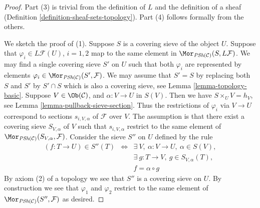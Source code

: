 \begin{proof}
Part (3) is trivial from the definition of $L$ and
the definition of a sheaf (Definition \ref{definition-sheaf-sets-topology}).
Part (4) follows formally from the others.

\medskip\noindent
We sketch the proof of (1). Suppose $S$ is a covering sieve
of the object $U$. Suppose that $\varphi_i \in L\mathcal{F}(U)$,
$i = 1, 2$ map to the same element in
$\Mor_{\textit{PSh}(\mathcal{C})}(S, L\mathcal{F})$.
We may find a single covering sieve $S'$ on $U$ such
that both $\varphi_i$ are represented by elements
$\varphi_i \in \Mor_{\textit{PSh}(\mathcal{C})}(S', \mathcal{F})$.
We may assume that $S' = S$ by replacing both $S$ and $S'$ by
$S' \cap S$ which is also a covering sieve, see Lemma \ref{lemma-topology-basic}.
Suppose $V\in \Ob(\mathcal{C})$, and
$\alpha : V \to U$ in $S(V)$.
Then we have $S \times_U V = h_V$,
see Lemma \ref{lemma-pullback-sieve-section}. Thus the restrictions
of $\varphi_i$ via $V \to U$ correspond to sections $s_{i, V, \alpha}$
of $\mathcal{F}$ over $V$. The assumption is that there exist
a covering sieve $S_{V, \alpha}$ of $V$ such that
$s_{i, V, \alpha}$ restrict to the same element of
$\Mor_{\textit{PSh}(\mathcal{C})}(S_{V, \alpha}, \mathcal{F})$.
Consider the sieve $S''$ on $U$ defined by the rule
\begin{eqnarray}
\label{equation-S-prime-prime}
(f : T \to U) \in S''(T)
& \Leftrightarrow &
\exists\ V , \ \alpha : V \to U, \ \alpha \in S(V), \nonumber \\
& &
\exists\ g : T \to V, \ g \in S_{V, \alpha}(T), \\
& &
f = \alpha \circ g \nonumber
\end{eqnarray}
By axiom (2) of a topology we see that $S''$ is a covering
sieve on $U$. By construction we see that $\varphi_1$
and $\varphi_2$ restrict to the same element of
$\Mor_{\textit{PSh}(\mathcal{C})}(S'', \mathcal{F})$
as desired.


\end{proof}
